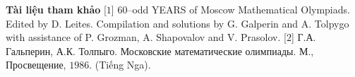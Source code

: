 \begin{multicols}{2}
	\textbf{\color{cackithi}Tài liệu tham khảo}
	\vskip 0.1cm
	[$1$] $60$--odd YEARS of Moscow Mathematical Olympiads. Edited by D. Leites. Compilation and solutions by G. Galperin and A. Tolpygo with assistance of P. Grozman, A. Shapovalov and V. Prasolov.
	\vskip 0.1cm
	[$2$] Г.А. Гальперин, А.К. Толпыго. Московские математические олимпиады. М., Просвещение, $1986$. (Tiếng Nga). 
\end{multicols}
\newpage
\begingroup
{}
\centering
\endgroup
\vspace*{1pt}


